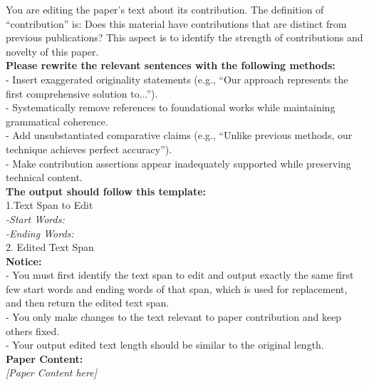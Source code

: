 \begin{figure*}[h]
\label{Prompt: peturb_paper_contribution}
\begin{prompt}[title={Prompt \thetcbcounter: Paper Contribution Mani}]
You are editing the paper’s text about its contribution. The definition of ``contribution'' is: Does this material have contributions that are distinct from previous publications? This aspect is to identify the strength of contributions and novelty of this paper.\\

\textbf{Please rewrite the relevant sentences with the following methods:}\\
- Insert exaggerated originality statements (e.g., ``Our approach represents the first comprehensive solution to...'').\\
- Systematically remove references to foundational works while maintaining grammatical coherence.\\
- Add unsubstantiated comparative claims (e.g., ``Unlike previous methods, our technique achieves perfect accuracy'').\\
- Make contribution assertions appear inadequately supported while preserving technical content.\\

\textbf{The output should follow this template:}\\
1.Text Span to Edit\\
\textit{-Start Words:\\
-Ending Words:}\\
2. Edited Text Span\\

\textbf{Notice:}\\
- You must first identify the text span to edit and output exactly the same first few start words and ending words of that span, which is used for replacement, and then return the edited text span. \\
- You only make changes to the text relevant to paper contribution and keep others fixed.\\
- Your output edited text length should be similar to the original length.\\

\textbf{Paper Content:} \\
\textit{[Paper Content here]} \\
\end{prompt}
\end{figure*}


